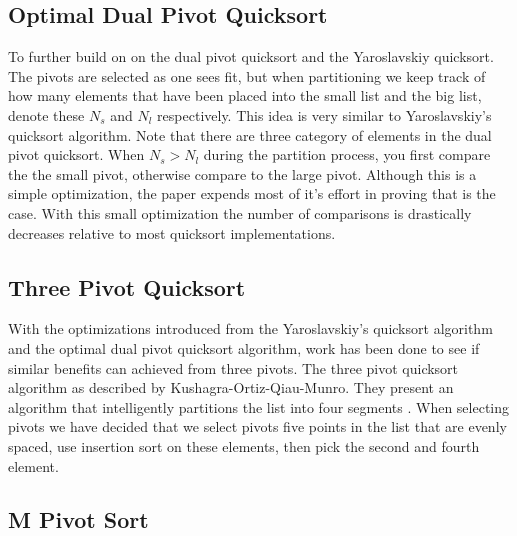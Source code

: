     \subsection{Optimal Dual Pivot Quicksort}
		\label{subsec:OptimalDualPivotQSortIntro}
		To further build on on the dual pivot quicksort and the Yaroslavskiy quicksort\cite{Aumuller:2013:OPD:2525857.2525862}. The pivots are selected as one sees fit, but when partitioning we keep track of how many elements that have been placed into the small list and the big list, denote these $N_s$ and $N_l$ respectively. This idea is very similar to Yaroslavskiy's quicksort algorithm. Note that there are three category of elements in the dual pivot quicksort. When $N_s > N_l$ during the partition process, you first compare the the small pivot, otherwise compare to the large pivot. Although this is a simple optimization, the paper expends most of it's effort in proving that is the case\cite{Aumuller:2013:OPD:2525857.2525862}. With this small optimization the number of comparisons is drastically decreases relative to most quicksort implementations.
		
	\subsection{Three Pivot Quicksort}	
		\label{subsec:ThreePivotQSortIntro}	
		With the optimizations introduced from the Yaroslavskiy's quicksort algorithm and the optimal dual pivot quicksort algorithm, work has been done to see if similar benefits can achieved from three pivots. The three pivot quicksort algorithm as described by Kushagra-Ortiz-Qiau-Munro. They present an algorithm that intelligently partitions the list into four segments \cite{kushagra2013multi}. When selecting pivots we have decided that we select pivots five points in the list that are evenly spaced, use insertion sort on these elements, then pick the second and fourth element.
		
	\subsection{M Pivot Sort}	
		\label{subsec:MPivotQSortIntro}
		
